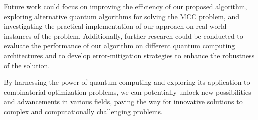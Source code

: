 Future work could focus on improving the efficiency of our proposed algorithm, exploring alternative quantum algorithms for solving the MCC problem, and investigating the practical implementation of our approach on real-world instances of the problem. Additionally, further research could be conducted to evaluate the performance of our algorithm on different quantum computing architectures and to develop error-mitigation strategies to enhance the robustness of the solution.

By harnessing the power of quantum computing and exploring its application to combinatorial optimization problems, we can potentially unlock new possibilities and advancements in various fields, paving the way for innovative solutions to complex and computationally challenging problems.

